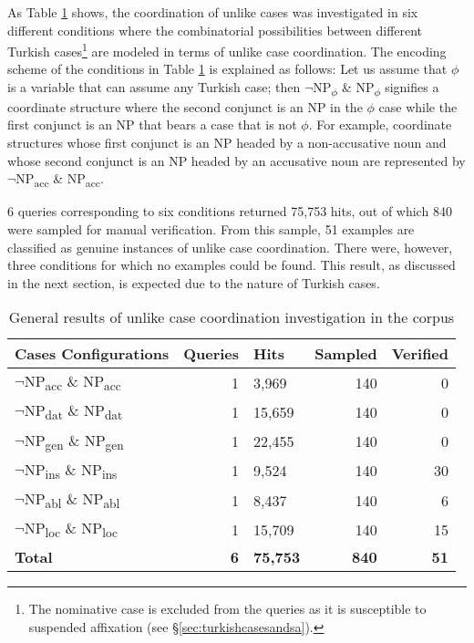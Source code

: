 As Table \ref{CASE-corpus-general-table} shows, the coordination of unlike cases was investigated in six different conditions where the combinatorial possibilities between different Turkish cases\footnote{The nominative case is excluded from the queries as it is susceptible to suspended affixation (see \S \ref{sec:turkishcasesandsa}).} are modeled in terms of unlike case coordination. The encoding scheme of the conditions in Table \ref{CASE-corpus-general-table} is explained as follows: Let us assume that $\phi$ is a variable that can assume any Turkish case; then $\neg$NP\textsubscript{$\phi$} \& NP\textsubscript{$\phi$} signifies a coordinate structure where the second conjunct is an NP in the $\phi$ case while the first conjunct is an NP that bears a case that is not $\phi$. For example, coordinate structures whose first conjunct is an NP headed by a non-accusative noun and whose second conjunct is an NP headed by an accusative noun are represented by $\neg$NP\textsubscript{acc} \& NP\textsubscript{acc}.

6 queries corresponding to six conditions returned 75,753 hits, out of which 840 were sampled for manual verification. From this sample, 51 examples are classified as genuine instances of unlike case coordination. There were, however, three conditions for which no examples could be found. This result, as discussed in the next section, is expected due to the nature of Turkish cases. 

\begin{table}[!h]
	\centering
	\begin{tabular}{lrlrr}
		\textbf{Cases Configurations} & \textbf{Queries} & \textbf{Hits}                       & \multicolumn{1}{l}{\textbf{Sampled}} & \multicolumn{1}{l}{\textbf{Verified}} \\ \hline \hline
		$\neg$NP\textsubscript{acc} \& NP\textsubscript{acc} & 1 & 3,969  & 140 & 0  \\
		$\neg$NP\textsubscript{dat} \& NP\textsubscript{dat} & 1 & 15,659 & 140 & 0  \\
		$\neg$NP\textsubscript{gen} \& NP\textsubscript{gen} & 1 & 22,455 & 140 & 0  \\
		$\neg$NP\textsubscript{ins} \& NP\textsubscript{ins} & 1 & 9,524  & 140 & 30 \\
		$\neg$NP\textsubscript{abl} \& NP\textsubscript{abl} & 1 & 8,437  & 140 & 6  \\
		$\neg$NP\textsubscript{loc} \& NP\textsubscript{loc} & 1 & 15,709 & 140 & 15 \\ \hline \hline
		\textbf{Total}                & \textbf{6}      & \multicolumn{1}{r}{\textbf{75,753}} & \textbf{840}                         & \textbf{51}                          
	\end{tabular}
	\caption{General results of unlike case coordination investigation in the corpus}
	\label{CASE-corpus-general-table}
\end{table}

